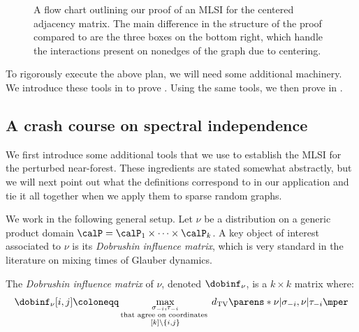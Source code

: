 \documentclass[11pt,letterpaper]{article}
\begin{document}
\begin{figure}
{
}
\caption{A flow chart outlining our proof of an MLSI for the centered adjacency matrix. The main difference in the structure of the proof compared to  are the three boxes on the bottom right, which handle the interactions present on nonedges of the graph due to centering.}
\label{fig:sbm-flowchart}
\end{figure}

To rigorously execute the above plan, we will need some additional machinery.
We introduce these tools in  to prove . 
Using the same tools, we then prove  in .

\subsection{A crash course on spectral independence}

We first introduce some additional tools that we use to establish the MLSI for the perturbed near-forest. 
These ingredients are stated somewhat abstractly, but we will next point out what the definitions correspond to in our application and tie it all together when we apply them to sparse random graphs.

We work in the following general setup.
Let $\nu$ be a distribution on a generic product domain $\calP = \calP_1\times\dots\times\calP_k$.
A key object of interest associated to $\nu$ is its \emph{Dobrushin influence matrix}, which is very standard in the literature on mixing times of Glauber dynamics.
\begin{definition}
    The \emph{Dobrushin influence matrix} of $\nu$, denoted $\dobinf_{\nu}$, is a $k\times k$ matrix where:
    \[
        \dobinf_{\nu}[i,j] \coloneqq \max_{\substack{\sigma_{-i}, \tau_{-i} \\ \text{that agree on coordinates }\\ [k]\setminus \{i,j\} }} d_{\mathrm{TV}}\parens*{ \nu|\sigma_{-i}, \nu|\tau_{-i} }\mper
    \]
\end{definition}
\end{document}
